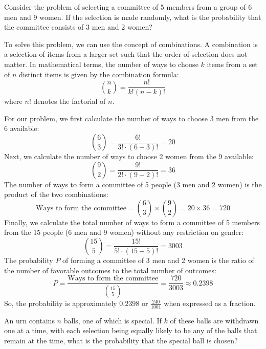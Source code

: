     \begin{example}
        Consider the problem of selecting a committee of 5 members from a group of 6 men and 9 women. If the selection is made randomly, what is the probability that the committee consists of 3 men and 2 women?
    \end{example}
        
        \begin{solution}
        To solve this problem, we can use the concept of combinations. A combination is a selection of items from a larger set such that the order of selection does not matter. In mathematical terms, the number of ways to choose $k$ items from a set of $n$ distinct items is given by the combination formula:
        \[
        \binom{n}{k} = \frac{n!}{k!(n-k)!}
        \]
        where $n!$ denotes the factorial of $n$.
        
        For our problem, we first calculate the number of ways to choose 3 men from the 6 available:
        \[
        \binom{6}{3} = \frac{6!}{3! \cdot (6-3)!} = 20
        \]
        Next, we calculate the number of ways to choose 2 women from the 9 available:
        \[
        \binom{9}{2} = \frac{9!}{2! \cdot (9-2)!} = 36
        \]
        The number of ways to form a committee of 5 people (3 men and 2 women) is the product of the two combinations:
        \[
        \text{Ways to form the committee} = \binom{6}{3} \times \binom{9}{2} = 20 \times 36 = 720
        \]
        Finally, we calculate the total number of ways to form a committee of 5 members from the 15 people (6 men and 9 women) without any restriction on gender:
        \[
        \binom{15}{5} = \frac{15!}{5! \cdot (15-5)!} = 3003
        \]
        The probability $P$ of forming a committee of 3 men and 2 women is the ratio of the number of favorable outcomes to the total number of outcomes:
        \[
        P = \frac{\text{Ways to form the committee}}{\binom{15}{5}} = \frac{720}{3003} \approx 0.2398
        \]
        So, the probability is approximately $0.2398$ or $\frac{240}{1001}$ when expressed as a fraction.
        \end{solution}
        
        \begin{example}
            An urn contains \(n\) balls, one of which is special. If \(k\) of these balls are withdrawn one at a time, with each selection being equally likely to be any of the balls that remain at the time, what is the probability that the special ball is chosen?
            \end{example}
            
